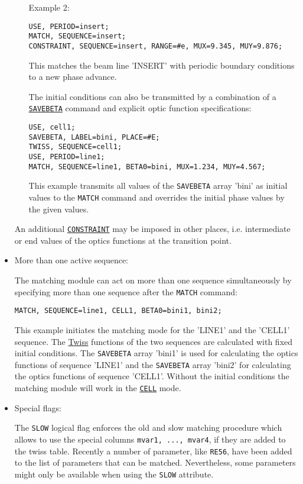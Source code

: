 \begin{itemize}
\begin{itemize}
Example 2:	
\begin{verbatim}
USE, PERIOD=insert;
MATCH, SEQUENCE=insert;
CONSTRAINT, SEQUENCE=insert, RANGE=#e, MUX=9.345, MUY=9.876;
\end{verbatim}
This matches the beam line 'INSERT' with periodic boundary conditions to
a new phase advance. 


 
The initial conditions can also be transmitted by a combination of a
\hyperref[sec:savebeta]{\tt SAVEBETA} command and explicit
optic function specifications: 
\begin{verbatim}
USE, cell1;
SAVEBETA, LABEL=bini, PLACE=#E;
TWISS, SEQUENCE=cell1;
USE, PERIOD=line1;
MATCH, SEQUENCE=line1, BETA0=bini, MUX=1.234, MUY=4.567;
\end{verbatim}

This example transmits all values of the {\tt SAVEBETA} array 'bini' as
initial values to the {\tt MATCH} command and overrides the initial phase
values by the given values.

\end{itemize}

An additional \hyperref[sec:constraint]{\tt CONSTRAINT} may be
imposed in other places, i.e. intermediate or end values of the optics
functions at the transition point.  
 
\item More than one active sequence:

The matching module can act on more than one sequence simultaneously by
specifying more than one sequence after the {\tt MATCH} command: 
\begin{verbatim}
MATCH, SEQUENCE=line1, CELL1, BETA0=bini1, bini2;
\end{verbatim}
This example initiates the matching mode for the 'LINE1' and the 'CELL1'
sequence. The \hyperref[chap:twiss]{Twiss} functions of the
two sequences are calculated with fixed initial conditions. 
The {\tt SAVEBETA}
array 'bini1' is used for calculating the optics functions of sequence
'LINE1' and the {\tt SAVEBETA} array 'bini2' for calculating the optics
functions of sequence 'CELL1'. Without the initial conditions the
matching module will work in the \hyperref[sec:cell]{\tt CELL}
mode. 
 
	\item  Special flags:

The {\tt SLOW} logical flag enforces the old and slow matching procedure
which allows to use the special columns {\tt mvar1, ..., mvar4}, if they
are added to the twiss table. Recently a number of parameter, like 
{\tt RE56}, have been added to the list of parameters that can be matched.
Nevertheless, some parameters might only be available when using the
{\tt SLOW} attribute.
 

\end{itemize}
 
